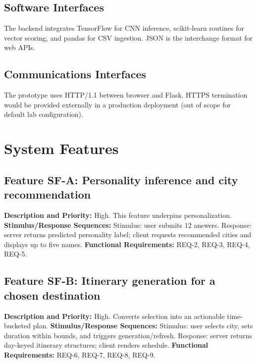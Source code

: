 \documentclass[12pt,oneside,openany]{report}
\begin{document}
\subsection{Software Interfaces}
The backend integrates TensorFlow for CNN inference, scikit-learn routines for vector scoring, and pandas for CSV ingestion. JSON is the interchange format for web APIs.

\subsection{Communications Interfaces}
The prototype uses HTTP/1.1 between browser and Flask. HTTPS termination would be provided externally in a production deployment (out of scope for default lab configuration).

\section{System Features}

\subsection{Feature SF-A: Personality inference and city recommendation}

\textbf{Description and Priority:} High. This feature underpins personalization.\newline
\textbf{Stimulus/Response Sequences:}\newline
Stimulus: user submits \(12\) answers.\newline
Response: server returns predicted personality label; client requests recommended cities and displays up to five names.\newline
\textbf{Functional Requirements:} REQ-2, REQ-3, REQ-4, REQ-5.

\subsection{Feature SF-B: Itinerary generation for a chosen destination}

\textbf{Description and Priority:} High. Converts selection into an actionable time-bucketed plan.\newline
\textbf{Stimulus/Response Sequences:}\newline
Stimulus: user selects city, sets duration within bounds, and triggers generation/refresh.\newline
Response: server returns day-keyed itinerary structures; client renders schedule.\newline
\textbf{Functional Requirements:} REQ-6, REQ-7, REQ-8, REQ-9.
\end{document}
